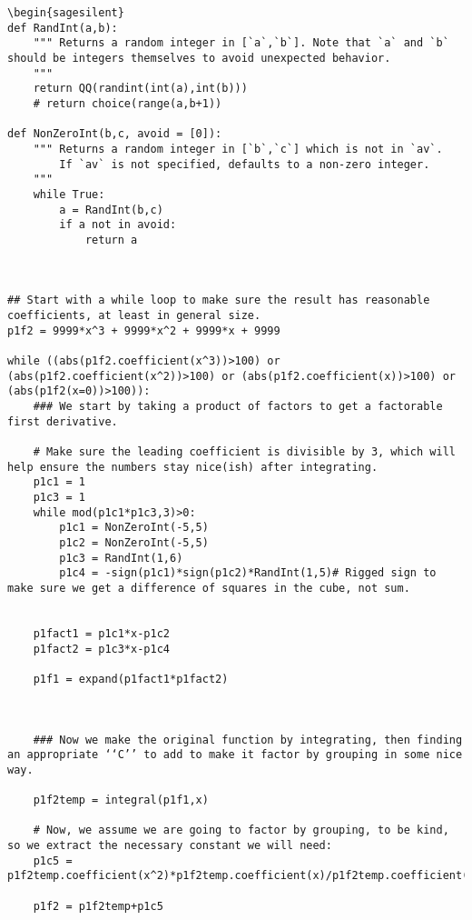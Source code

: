 \documentclass{ximera}
\begin{document}
\begin{verbatim}
\begin{sagesilent}
def RandInt(a,b):
    """ Returns a random integer in [`a`,`b`]. Note that `a` and `b` should be integers themselves to avoid unexpected behavior.
    """
    return QQ(randint(int(a),int(b)))
    # return choice(range(a,b+1))

def NonZeroInt(b,c, avoid = [0]):
    """ Returns a random integer in [`b`,`c`] which is not in `av`. 
        If `av` is not specified, defaults to a non-zero integer.
    """
    while True:
        a = RandInt(b,c)
        if a not in avoid:
            return a



## Start with a while loop to make sure the result has reasonable coefficients, at least in general size.
p1f2 = 9999*x^3 + 9999*x^2 + 9999*x + 9999

while ((abs(p1f2.coefficient(x^3))>100) or (abs(p1f2.coefficient(x^2))>100) or (abs(p1f2.coefficient(x))>100) or (abs(p1f2(x=0))>100)):
    ### We start by taking a product of factors to get a factorable first derivative.
     
    # Make sure the leading coefficient is divisible by 3, which will help ensure the numbers stay nice(ish) after integrating.
    p1c1 = 1
    p1c3 = 1
    while mod(p1c1*p1c3,3)>0:
        p1c1 = NonZeroInt(-5,5)
        p1c2 = NonZeroInt(-5,5)
        p1c3 = RandInt(1,6)
        p1c4 = -sign(p1c1)*sign(p1c2)*RandInt(1,5)# Rigged sign to make sure we get a difference of squares in the cube, not sum.
    
     
    p1fact1 = p1c1*x-p1c2
    p1fact2 = p1c3*x-p1c4
     
    p1f1 = expand(p1fact1*p1fact2)
    
    
    
    ### Now we make the original function by integrating, then finding an appropriate ‘‘C’’ to add to make it factor by grouping in some nice way.
     
    p1f2temp = integral(p1f1,x)
     
    # Now, we assume we are going to factor by grouping, to be kind, so we extract the necessary constant we will need:
    p1c5 = p1f2temp.coefficient(x^2)*p1f2temp.coefficient(x)/p1f2temp.coefficient(x^3)
     
    p1f2 = p1f2temp+p1c5
     

\end{verbatim}
\end{document}
